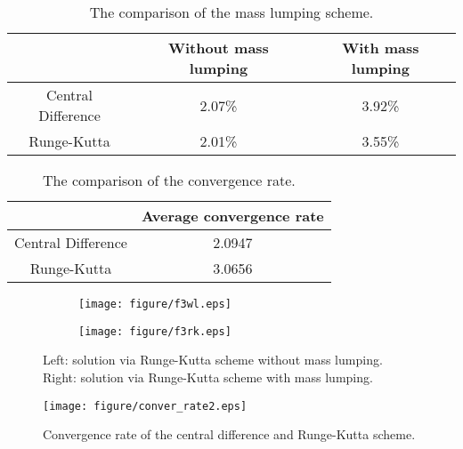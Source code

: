 \documentclass[preprint,12pt]{elsarticle}
\begin{document}
\begin{table}[H]
\centering
\begin{tabular}{c|c|c}
~ & Without mass lumping & With mass lumping  \\
\hline
Central Difference& 2.07\% & 3.92\%  \\
\hline
Runge-Kutta & 2.01\% & 3.55\%  \\
\hline
\end{tabular}
\caption{The comparison of the mass lumping scheme.}
 \label{tableMKc30}
\end{table}
 \begin{table}[H]
\centering
\begin{tabular}{c|c}
  ~ & Average convergence rate \\
\hline
Central Difference & 2.0947 \\
\hline
Runge-Kutta & 3.0656 \\
\hline
\end{tabular}
\caption{The comparison of the convergence rate.}
 \label{tableKPP20}
\end{table}
\begin{figure}[H]
    \centering
    \begin{subfigure}{0.42\textwidth}
        \texttt{[image: figure/f3wl.eps]}
        \caption{}
        \label{fig:image21c0}
    \end{subfigure}
    \begin{subfigure}{0.42\textwidth}
        \texttt{[image: figure/f3rk.eps]}
        \caption{}
        \label{fig:image22c0}
    \end{subfigure}
    \caption{Left: solution via Runge-Kutta scheme without mass lumping. Right: solution via Runge-Kutta scheme with mass lumping.}
    \label{fig:mll}
\end{figure}
\begin{figure}[H]
     \centering
     \texttt{[image: figure/conver\_rate2.eps]}
     \caption{Convergence rate of the central difference and Runge-Kutta scheme.}
     \label{fig:cc21}
 \end{figure}
\end{document}
